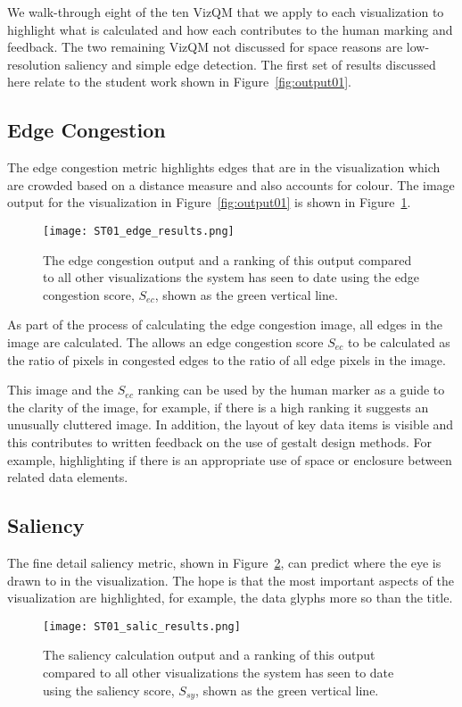 We walk-through eight of the ten VizQM that we apply to each visualization to highlight what is calculated and how each contributes to the human marking and feedback. The two remaining VizQM not discussed for space reasons are low-resolution saliency and simple edge detection. The first set of results discussed here relate to the student work shown in Figure~\ref{fig:output01}.

\subsection{Edge Congestion}

The edge congestion metric highlights edges that are in the visualization which are crowded based on a distance measure and also accounts for colour. The image output for the visualization in Figure~\ref{fig:output01} is shown in Figure~\ref{fig:edgeResults}.
\begin{figure}[htb]
  \centering
  \texttt{[image: ST01\_edge\_results.png]}

  \caption{\label{fig:edgeResults}
           The edge congestion output and a ranking of this output compared to all other visualizations the system has seen to date using the edge congestion score, $S_{ec}$, shown as the green vertical line.}
\end{figure}

As part of the process of calculating the edge congestion image, all edges in the image are calculated. The allows an edge congestion score $S_{ec}$ to be calculated as the ratio of pixels in congested edges to the ratio of all edge pixels in the image.

This image and the $S_{ec}$ ranking can be used by the human marker as a guide to the clarity of the image, for example, if there is a high ranking it suggests an unusually cluttered image. In addition, the layout of key data items is visible and this contributes to written feedback on the use of gestalt design methods. For example,  highlighting if there is an appropriate use of space or enclosure between related data elements. 

\subsection{Saliency}

The fine detail saliency metric, shown in Figure~\ref{fig:salicResults}, can predict where the eye is drawn to in the visualization. The hope is that the most important aspects of the visualization are highlighted, for example, the data glyphs more so than the title.
\begin{figure}[htb]
  \centering
  \texttt{[image: ST01\_salic\_results.png]}

  \caption{\label{fig:salicResults}
           The saliency calculation output and a ranking of this output compared to all other visualizations the system has seen to date using the saliency score, $S_{sy}$, shown as the green vertical line.}
\end{figure}

